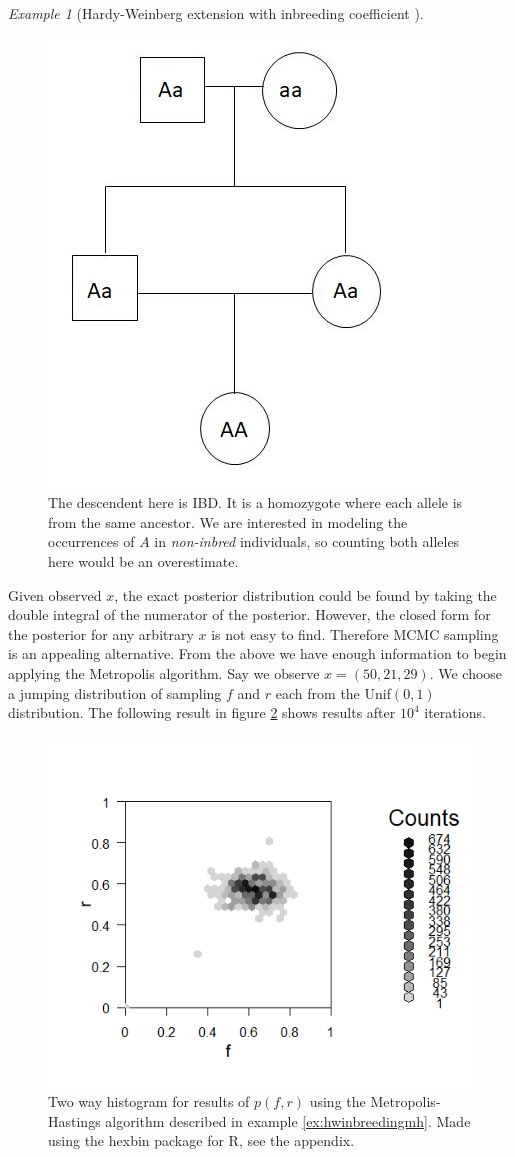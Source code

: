 \documentclass[11pt]{amsart}
\theoremstyle{theorem} %
\theoremstyle{definition}                  %
\theoremstyle{example}                       %
\theoremstyle{remark}                       %
\newtheorem{exmp}[thm]{Example}  %
\numberwithin{equation}{section}
\begin{document}
\begin{exmp}[{Hardy-Weinberg extension with inbreeding coefficient \cite{stephens}}]
    \begin{figure}
        \centering
        \includegraphics[width = .5\textwidth]{IBD.jpg}
        \caption{The descendent here is IBD. It is a homozygote where each allele is from the same ancestor. We are interested in modeling the occurrences of $A$ in {\em non-inbred} individuals, so counting both alleles here would be an overestimate.}
        \label{fig:IBD}
    \end{figure}
    
    Given observed $x$, the exact posterior distribution could be found by taking the double integral of the numerator of the posterior. However, the closed form for the posterior for any arbitrary $x$ is not easy to find. Therefore MCMC sampling is an appealing alternative. From the above we have enough information to begin applying the Metropolis algorithm. Say we observe $x=(50, 21, 29)$. We choose a jumping distribution of sampling $f$ and $r$ each from the Unif$(0,1)$ distribution. The following result in figure \ref{fig:inbreedmh} shows results after $10^4$ iterations.
    
    \begin{figure}
        \centering
        \includegraphics[width=4 in]{inbreed.png}
        \caption{Two way histogram for results of $p(f,r)$ using the Metropolis-Hastings algorithm described in example \ref{ex:hwinbreedingmh}. Made using the hexbin package for R, see the appendix.}
        \label{fig:inbreedmh}
    \end{figure}
    

\end{exmp}
\end{document}
